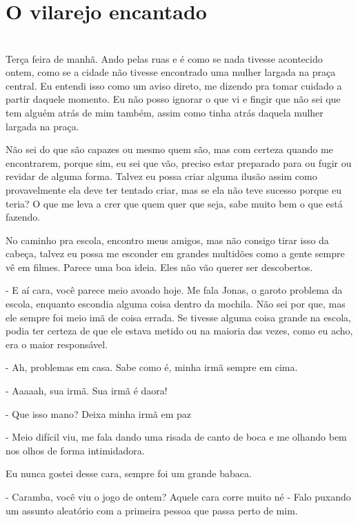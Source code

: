 
\newpage


\ifdefined\useChapters
\chapter{O vilarejo encantado}
\else
\chapter{}
\fi
Terça feira de manhã. Ando pelas ruas e é como se nada tivesse acontecido ontem, como se a cidade não tivesse encontrado uma mulher largada na praça central. Eu entendi isso como um aviso direto, me dizendo pra tomar cuidado a partir daquele momento. Eu não posso ignorar o que vi e fingir que não sei que tem alguém atrás de mim também, assim como tinha atrás daquela mulher largada na praça. 

Não sei do que são capazes ou mesmo quem são, mas com certeza quando me encontrarem, porque sim, eu sei que vão, preciso estar preparado para ou fugir ou revidar de alguma forma. Talvez eu possa criar alguma ilusão assim como provavelmente ela deve ter tentado criar, mas se ela não teve sucesso porque eu teria? O que me leva a crer que quem quer que seja, sabe muito bem o que está fazendo.

No caminho pra escola, encontro meus amigos, mas não consigo tirar isso da cabeça, talvez eu possa me esconder em grandes multidões como a gente sempre vê em filmes. Parece uma boa ideia. Eles não vão querer ser descobertos.

- E aí cara, você parece meio avoado hoje. Me fala Jonas, o garoto problema da escola, enquanto escondia alguma coisa dentro da mochila. Não sei por que, mas ele sempre foi meio imã de coisa errada. Se tivesse alguma coisa grande na escola, podia ter certeza de que ele estava metido ou na maioria das vezes, como eu acho, era o maior responsável.

- Ah, problemas em casa. Sabe como é, minha irmã sempre em cima.

- Aaaaah, sua irmã. Sua irmã é daora!

- Que isso mano? Deixa minha irmã em paz

- Meio difícil viu, me fala dando uma risada de canto de boca e me olhando bem nos olhos de forma intimidadora.

Eu nunca gostei desse cara, sempre foi um grande babaca.

- Caramba, você viu o jogo de ontem? Aquele cara corre muito né - Falo puxando um assunto aleatório com a primeira pessoa que passa perto de mim.

